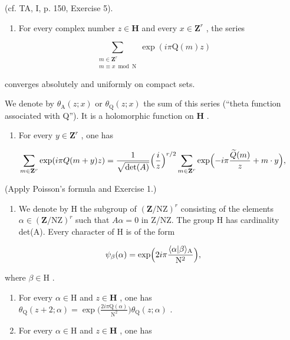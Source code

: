   (cf. TA, I, p. 150, Exercise 5).

\begin{enumerate}
\def\labelenumi{\alph{enumi})}
\setcounter{enumi}{1}
\tightlist
\item
  For every complex number \(z \in \mathbf{H}\) and every \(x \in \mathbf{Z}^r\) , the series
\end{enumerate}

\[
\sum_{\substack{m\in \mathbf{Z}^{r}\\ m\equiv x\bmod \mathrm{N}}}\exp (i\pi \mathrm{Q}(m)z)
\]

converges absolutely and uniformly on compact sets.

We denote by \(\theta_{\mathrm{A}}(z;x)\) or \(\theta_{\mathrm{Q}}(z;x)\) the sum of this series (“theta function associated with Q”). It is a holomorphic function on \(\mathbf{H}\) .

\begin{enumerate}
\def\labelenumi{\alph{enumi})}
\setcounter{enumi}{2}
\tightlist
\item
  For every \(y \in \mathbf{Z}^r\) , one has
\end{enumerate}

\[
\sum_ {m \in {\bf Z} ^ {r}} \exp (i \pi Q (m + y) z) = \frac {1}{\sqrt {\det (A)}} \Bigl (\frac {i}{z} \Bigr) ^ {r / 2} \sum_ {m \in {\bf Z} ^ {r}} \exp \Bigl (- i \pi \frac {\widetilde {Q} (m)}{z} + m \cdot y \Bigr),
\]

(Apply Poisson's formula and Exercise 1.)

\begin{enumerate}
\def\labelenumi{\alph{enumi})}
\setcounter{enumi}{3}
\tightlist
\item
  We denote by H the subgroup of \((\mathbf{Z}/\mathrm{NZ})^{r}\) consisting of the elements \(\alpha\in(\mathbf{Z}/\mathrm{NZ})^{r}\) such that \(A\alpha=0\) in Z/NZ. The group H has cardinality det(A). Every character of H is of the form
\end{enumerate}

\[
\psi_ {\beta} (\alpha) = \exp \Bigl (2 i \pi \frac {\langle \alpha | \beta \rangle_ {\mathrm{A}}}{\mathrm{N} ^ {2}} \Bigr),
\]

where \(\beta\in\mathrm{H}\) .

\begin{enumerate}
\def\labelenumi{\alph{enumi})}
\setcounter{enumi}{4}
\item
  For every \(\alpha \in \mathrm{H}\) and \(z\in \mathbf{H}\) , one has \(\theta_{\mathrm{Q}}(z + 2;\alpha) = \exp \bigl (\frac{2i\pi\mathrm{Q}(\alpha)}{\mathrm{N}^2}\bigr)\theta_{\mathrm{Q}}(z;\alpha)\) .
\item
  For every \(\alpha \in \mathrm{H}\) and \(z\in \mathbf{H}\) , one has
\end{enumerate}

